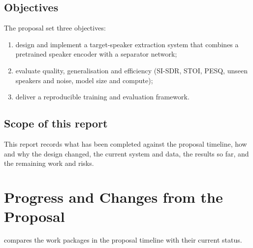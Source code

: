 \documentclass[11pt,a4paper]{article}
\newcommand{\sisdr}{SI-SDR}
\begin{document}
\subsection{Objectives}
The proposal set three objectives:
\begin{enumerate}
  \item design and implement a target-speaker extraction system that combines a pretrained speaker
        encoder with a separator network;
  \item evaluate quality, generalisation and efficiency (\sisdr, STOI, PESQ, unseen speakers and
        noise, model size and compute);
  \item deliver a reproducible training and evaluation framework.
\end{enumerate}

\subsection{Scope of this report}
This report records what has been completed against the proposal timeline, how and why the design
changed, the current system and data, the results so far, and the remaining work and risks.

\section{Progress and Changes from the Proposal}
\label{sec:changes}

 compares the work packages in the proposal timeline with their current status.
\end{document}
